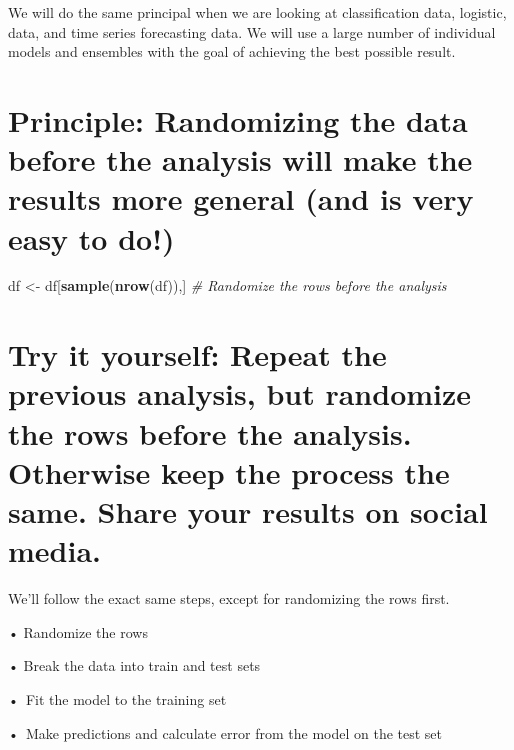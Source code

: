 \documentclass[
]{book}
\newenvironment{Shaded}{\begin{snugshade}}{\end{snugshade}}
\newcommand{\CommentTok}[1]{\textcolor[rgb]{0.56,0.35,0.01}{\textit{#1}}}
\newcommand{\FunctionTok}[1]{\textcolor[rgb]{0.13,0.29,0.53}{\textbf{#1}}}
\newcommand{\NormalTok}[1]{#1}
\newcommand{\OtherTok}[1]{\textcolor[rgb]{0.56,0.35,0.01}{#1}}
\begin{document}
We will do the same principal when we are looking at classification
data, logistic, data, and time series forecasting data. We will use a
large number of individual models and ensembles with the goal of
achieving the best possible result.

\section{Principle: Randomizing the data before the analysis will make the results more general (and is very easy to do!)}\label{principle-randomizing-the-data-before-the-analysis-will-make-the-results-more-general-and-is-very-easy-to-do}

\begin{Shaded}
\begin{Highlighting}[]
\NormalTok{df }\OtherTok{\textless{}{-}}\NormalTok{ df[}\FunctionTok{sample}\NormalTok{(}\FunctionTok{nrow}\NormalTok{(df)),] }\CommentTok{\# Randomize the rows before the analysis}
\end{Highlighting}
\end{Shaded}

\section{Try it yourself: Repeat the previous analysis, but randomize the rows before the analysis. Otherwise keep the process the same. Share your results on social media.}\label{try-it-yourself-repeat-the-previous-analysis-but-randomize-the-rows-before-the-analysis.-otherwise-keep-the-process-the-same.-share-your-results-on-social-media.}

We'll follow the exact same steps, except for randomizing the rows
first.

• Randomize the rows

• Break the data into train and test sets

•~Fit the model to the training set

•~Make predictions and calculate error from the model on the test set
\end{document}
